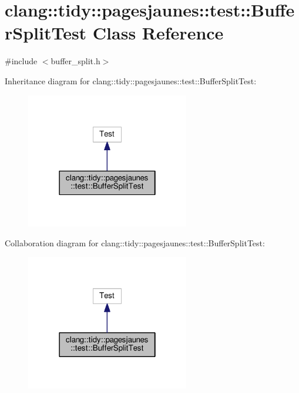 \hypertarget{classclang_1_1tidy_1_1pagesjaunes_1_1test_1_1_buffer_split_test}{}\section{clang\+:\+:tidy\+:\+:pagesjaunes\+:\+:test\+:\+:Buffer\+Split\+Test Class Reference}
\label{classclang_1_1tidy_1_1pagesjaunes_1_1test_1_1_buffer_split_test}


{\ttfamily \#include $<$buffer\+\_\+split.\+h$>$}



Inheritance diagram for clang\+:\+:tidy\+:\+:pagesjaunes\+:\+:test\+:\+:Buffer\+Split\+Test\+:
\nopagebreak
\begin{figure}[H]
\begin{center}
\leavevmode
\includegraphics[width=202pt]{classclang_1_1tidy_1_1pagesjaunes_1_1test_1_1_buffer_split_test__inherit__graph}
\end{center}
\end{figure}


Collaboration diagram for clang\+:\+:tidy\+:\+:pagesjaunes\+:\+:test\+:\+:Buffer\+Split\+Test\+:
\nopagebreak
\begin{figure}[H]
\begin{center}
\leavevmode
\includegraphics[width=202pt]{classclang_1_1tidy_1_1pagesjaunes_1_1test_1_1_buffer_split_test__coll__graph}
\end{center}
\end{figure}

